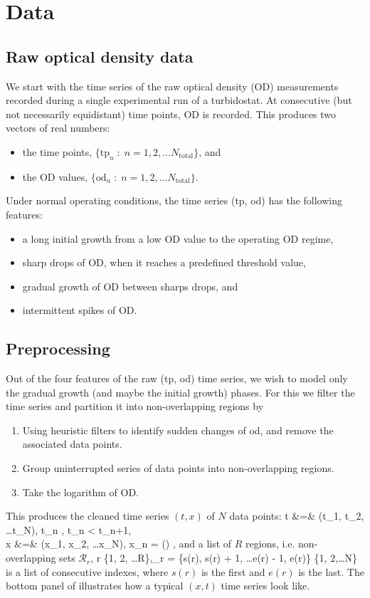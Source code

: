 \section{Data}

\subsection{Raw optical density data}
We start with the time series of the raw optical density (OD) measurements recorded during a single experimental run of a turbidostat. At consecutive (but not necessarily equidistant) time points, OD is recorded. This produces two vectors of real numbers:
\begin{itemize}
	\item the time points, $\{\text{tp}_n\;:\; n = 1,2, \ldots N_\text{total}\}$, and
	\item the OD values, $\{\text{od}_n\;:\; n = 1,2, \ldots N_\text{total}\}$.
\end{itemize}
Under normal operating conditions, the time series (tp, od) has the following features:
\begin{itemize}
	\item a long initial growth from a low OD value to the operating OD regime,
	\item sharp drops of OD, when it reaches a predefined threshold value,
	\item gradual growth of OD between sharps drops, and
	\item intermittent spikes of OD.
\end{itemize}

\subsection{Preprocessing}
Out of the four features of the raw (tp, od) time series, we wish to model only the gradual growth (and maybe the initial growth) phases. For this we filter the time series and partition it into non-overlapping regions by 
\begin{enumerate}
	\item Using heuristic filters to identify sudden changes of od, and remove the associated data points.
	\item Group uninterrupted series of data points into non-overlapping regions.
	\item Take the logarithm of OD.
\end{enumerate}
This produces the cleaned time series $(t, x)$ of $N$ data points:
\ba
	t &=& (t_1, t_2, \ldots t_N), \quad {}\; t_n \in {},\quad {}\; t_n < t_{n+1}, \\
	x &=& (x_1, x_2, \ldots x_N), \quad {}\; x_n = \log() \in {},
\ea
and a list of $R$ regions, i.e. non-overlapping sets $\mathcal{R}_r$,
\be
	r \in \{1, 2, \ldots R\},\qquad {}_r = \{s(r), s(r) + 1, \ldots e(r) - 1, e(r)\} \subset \{1, 2,\ldots N\}
\ee
is a list of consecutive indexes, where $s(r)$ is the first and $e(r)$ is the last. The bottom panel of  illustrates how a typical $(x,t)$ time series look like.

